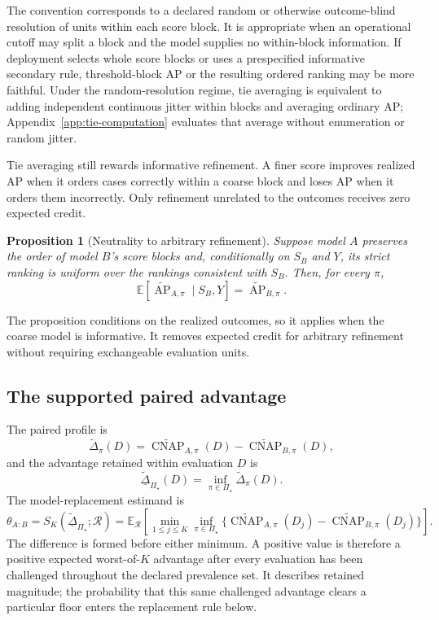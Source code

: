 \documentclass[11pt]{article}
\newcommand{\AP}{\operatorname{AP}}
\newcommand{\CNAP}{\operatorname{CNAP}}
\newcommand{\Regime}{\mathcal{R}}
\newcommand{\PSet}{\Pi_\star}
\newcommand{\E}{\mathbb{E}}
\newcommand{\APta}{\widetilde{\AP}}
\newcommand{\CNAPta}{\widetilde{\CNAP}}
\newcommand{\Dta}{\widetilde{\Delta}}
\newcommand{\RobDta}{\underline{\widetilde{\Delta}}_{\PSet}}
\newtheorem{proposition}{Proposition}
\theoremstyle{remark}
\begin{document}
The convention corresponds to a declared random or otherwise outcome-blind resolution of units within each score block. It is appropriate when an operational cutoff may split a block and the model supplies no within-block information. If deployment selects whole score blocks or uses a prespecified informative secondary rule, threshold-block AP or the resulting ordered ranking may be more faithful. Under the random-resolution regime, tie averaging is equivalent to adding independent continuous jitter within blocks and averaging ordinary AP; Appendix~\ref{app:tie-computation} evaluates that average without enumeration or random jitter.

Tie averaging still rewards informative refinement. A finer score improves realized AP when it orders cases correctly within a coarse block and loses AP when it orders them incorrectly. Only refinement unrelated to the outcomes receives zero expected credit.

\begin{proposition}[Neutrality to arbitrary refinement]
\label{prop:refinement}
Suppose model $A$ preserves the order of model $B$'s score blocks and, conditionally on $S_B$ and $Y$, its strict ranking is uniform over the rankings consistent with $S_B$. Then, for every $\pi$,
\[
\E\!\left[
\APta_{A,\pi}\mid S_B,Y
\right]
=
\APta_{B,\pi}.
\]
\end{proposition}

The proposition conditions on the realized outcomes, so it applies when the coarse model is informative. It removes expected credit for arbitrary refinement without requiring exchangeable evaluation units.

\subsection{The supported paired advantage}

The paired profile is
\[
\Dta_\pi(D)
=
\CNAPta_{A,\pi}(D)
-
\CNAPta_{B,\pi}(D),
\]
and the advantage retained within evaluation $D$ is
\[
\RobDta(D)
=
\inf_{\pi\in\PSet}\Dta_\pi(D).
\]
The model-replacement estimand is
\begin{equation}
\theta_{A:B}
=
S_K(\RobDta;\Regime)
=
\E_{\Regime}
\left[
\min_{1\leq j\leq K}
\inf_{\pi\in\PSet}
\{\CNAPta_{A,\pi}(D_j)-\CNAPta_{B,\pi}(D_j)\}
\right].
\label{eq:paired-estimand}
\end{equation}
The difference is formed before either minimum. A positive value is therefore a positive expected worst-of-$K$ advantage after every evaluation has been challenged throughout the declared prevalence set. It describes retained magnitude; the probability that this same challenged advantage clears a particular floor enters the replacement rule below.
\end{document}
